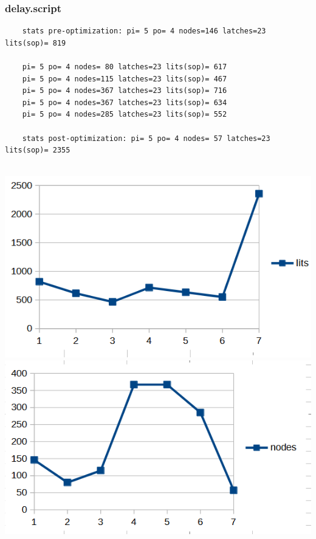 \documentclass[a4paper,11pt]{article}
\begin{document}
\subsubsection{delay.script}
    \begin{verbatim}
    stats pre-optimization: pi= 5 po= 4 nodes=146 latches=23 lits(sop)= 819
    
    pi= 5 po= 4 nodes= 80 latches=23 lits(sop)= 617
    pi= 5 po= 4 nodes=115 latches=23 lits(sop)= 467
    pi= 5 po= 4 nodes=367 latches=23 lits(sop)= 716
    pi= 5 po= 4 nodes=367 latches=23 lits(sop)= 634
    pi= 5 po= 4 nodes=285 latches=23 lits(sop)= 552
    
    stats post-optimization: pi= 5 po= 4 nodes= 57 latches=23 lits(sop)= 2355
    
    \end{verbatim}
    \begin{center}
        \includegraphics[width=0.6\linewidth]{assets/Charts/DelayL.png}
        \includegraphics[width=0.6\linewidth]{assets/Charts/DelayN.png}
    \end{center}
    
\end{document}
